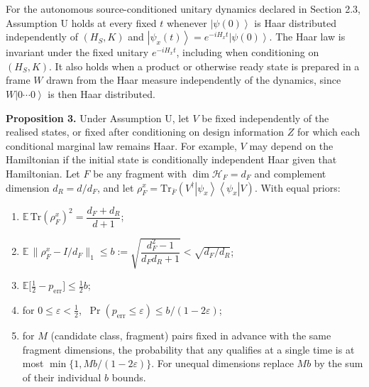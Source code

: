 \documentclass[
  10pt,
  a4paper,
]{article}
\begin{document}
For the autonomous source-conditioned unitary dynamics declared in
Section 2.3, Assumption U holds at every fixed \(t\) whenever
\(\left| \psi(0)\right\rangle\) is Haar distributed independently of
\((H_S,K)\) and
\(\left| \psi_x(t)\right\rangle =e^{-iH_xt}\left| \psi(0)\right\rangle\).
The Haar law is invariant under the fixed unitary \(e^{-iH_xt}\),
including when conditioning on \((H_S,K)\). It also holds when a product
or otherwise ready state is prepared in a frame \(W\) drawn from the
Haar measure independently of the dynamics, since
\(W\left| 0\cdots0\right\rangle\) is then Haar distributed.

\textbf{Proposition 3.} Under Assumption U, let \(V\) be fixed
independently of the realised states, or fixed after conditioning on
design information \(Z\) for which each conditional marginal law remains
Haar. For example, \(V\) may depend on the Hamiltonian if the initial
state is conditionally independent Haar given that Hamiltonian. Let
\(F\) be any fragment with \(\dim\mathcal H_F=d_F\) and complement
dimension \(d_R=d/d_F\), and let
\(\rho^x_F=\mathrm{Tr}_{\bar F}(V^\dagger\left| \psi_x\right\rangle \left\langle \psi_x\right| V)\).
With equal priors:

\begin{enumerate}
\def\labelenumi{(\roman{enumi})}
\item
  \(\mathbb E\,\mathrm{Tr}(\rho^x_F)^2=\dfrac{d_F+d_R}{d+1}\);
\item
  \(\mathbb E\,\|\rho^x_F-I/d_F\|_1\le b:=\sqrt{\dfrac{d_F^2-1}{d_Fd_R+1}}<\sqrt{d_F/d_R}\);
\item
  \(\mathbb E\bigl[\tfrac12-p_{\mathrm{err}}\bigr]\le\tfrac12b\);
\item
  for \(0\le\varepsilon<\tfrac12\),
  \(\ \Pr(p_{\mathrm{err}}\le\varepsilon)\le b/(1-2\varepsilon)\);
\item
  for \(M\) (candidate class, fragment) pairs fixed in advance with the
  same fragment dimensions, the probability that any qualifies at a
  single time is at most \(\min\{1,Mb/(1-2\varepsilon)\}\). For unequal
  dimensions replace \(Mb\) by the sum of their individual \(b\) bounds.
\end{enumerate}
\end{document}
